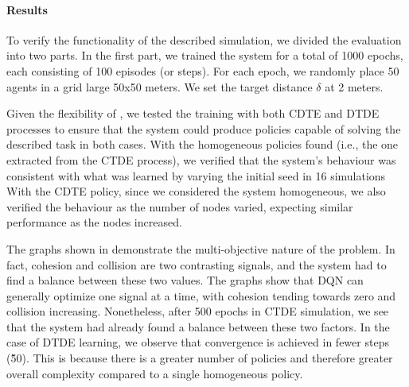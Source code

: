 \paragraph{Results}
To verify the functionality of the described simulation, 
 we divided the evaluation into two parts. 
%
In the first part, 
 we trained the system for a total of 1000 epochs, 
 each consisting of 100 episodes (or steps). 
%
For each epoch,
 we randomly place 50 agents in a grid large 50x50 meters.
 We set the target distance $\delta$ at 2 meters.

Given the flexibility of \scarlib{}, 
 we tested the training with both CDTE and DTDE processes 
 to ensure that the system could produce policies 
 capable of solving the described task in both cases. 
% 
With the homogeneous policies found (i.e., the one extracted from the CTDE process), 
 we verified that the system's behaviour 
 was consistent with what was learned by varying the initial seed 
 in 16 simulations
%
With the CDTE policy, 
 since we considered the system homogeneous, 
 we also verified the behaviour as the number of nodes varied,
 expecting similar performance as the nodes increased.

The graphs shown in  
 demonstrate the multi-objective nature of the problem. 
In fact, cohesion and collision are two contrasting signals, 
 and the system had to find a balance between these two values. 
 The graphs show that DQN can generally optimize one signal at a time, 
 with cohesion tending towards zero and collision increasing. 
% 
Nonetheless, after 500 epochs in CTDE simulation,  
 we see that the system had already found a balance between these two factors.
%
In the case of DTDE learning, 
 we observe that convergence is achieved in fewer steps (\~ 50). 
 This is because there is a greater number of policies and 
 therefore greater overall complexity compared to a single homogeneous policy.

